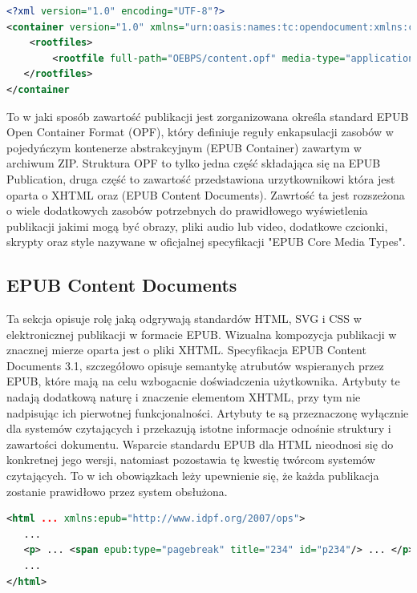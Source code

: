 \begin{lstlisting}[caption={Przykładowy plik container.xml}, language=XML]
<?xml version="1.0" encoding="UTF-8"?>
<container version="1.0" xmlns="urn:oasis:names:tc:opendocument:xmlns:container">
    <rootfiles>
        <rootfile full-path="OEBPS/content.opf" media-type="application/oebps-package+xml"/>
   </rootfiles>
</container
\end{lstlisting}

To w jaki sposób zawartość publikacji jest zorganizowana określa standard EPUB Open Container Format (OPF), który definiuje reguły enkapsulacji zasobów w pojedyńczym kontenerze abstrakcyjnym (EPUB Container) zawartym w archiwum ZIP. Struktura OPF to tylko jedna część składająca się na EPUB Publication, druga część to zawartość przedstawiona urzytkownikowi która jest oparta o XHTML oraz (EPUB Content Documents). Zawrtość ta jest rozszeżona o wiele dodatkowych zasobów potrzebnych do prawidłowego wyświetlenia publikacji jakimi mogą być obrazy, pliki audio lub video, dodatkowe czcionki, skrypty oraz style nazywane w oficjalnej specyfikacji "EPUB Core Media Types".

\subsection{EPUB Content Documents}

Ta sekcja opisuje rolę jaką odgrywają standardów HTML, SVG i CSS w elektronicznej publikacji w formacie EPUB. Wizualna kompozycja publikacji w znacznej mierze oparta jest o pliki XHTML. Specyfikacja EPUB Content Documents 3.1, szczegółowo opisuje semantykę atrubutów wspieranych przez EPUB, które mają na celu wzbogacnie doświadczenia użytkownika. Artybuty te nadają dodatkową naturę i znaczenie elementom XHTML, przy tym nie nadpisując ich pierwotnej funkcjonalności. Artybuty te są przeznaczonę wyłącznie dla systemów czytających i przekazują istotne informacje odnośnie struktury i zawartości dokumentu. Wsparcie standardu EPUB dla HTML nieodnosi się do konkretnej jego wersji, natomiast pozostawia tę kwestię twórcom systemów czytających. To w ich obowiązkach leży upewnienie się, że każda publikacja zostanie prawidłowo przez system obsłużona.

\begin{lstlisting}[float=h, caption={Przykładowe wykorzystanie atrybutu epub:type aby oznaczyć zakończenie linii.\protect\cite{EPUBContentDocumentsSpecificationXML}}, language=XML]
<html ... xmlns:epub="http://www.idpf.org/2007/ops">
   ...
   <p> ... <span epub:type="pagebreak" title="234" id="p234"/> ... </p>
   ...
</html>
\end{lstlisting}

